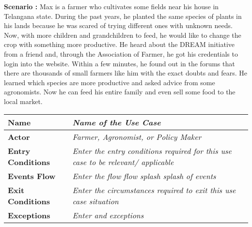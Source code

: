 \begin{flushleft}
\textbf{Scenario :} 
Max is a farmer who cultivates some fields near his house in Telangana state. During the past years, he planted the same species of plants in his lands because he was scared of trying different ones with unknown needs. Now, with more children and grandchildren to feed, he would like to change the crop with something more productive. 
He heard about the DREAM initiative from a friend and, through the Association of Farmer, he got his credentials to login into the website.
Within a few minutes, he found out in the forums that there are thousands of small farmers like him with the exact doubts and fears.
He learned which species are more productive and asked advice from some agronomists.
Now he can feed his entire family and even sell some food to the local market.
\end{flushleft}

\begin{center}
\begin{tabular}{|l|>{\raggedright\arraybackslash}m{12cm}|}

    \hline
    \textbf{Name} & \textit{Name of the Use Case}\\
    \hline
   	\textbf{Actor} & \textit{Farmer, Agronomist, or Policy Maker}\\
    \hline
    \textbf{Entry Conditions} & \textit{Enter the entry conditions required for this use case to be relevant/ applicable}\\
    \hline
    \textbf{Events Flow} & \textit{Enter the flow flow splash splash of events}\\
    \hline
    \textbf{Exit Conditions} & \textit{Enter the circumstances required to exit this use case situation}\\
    \hline
    \textbf{Exceptions} & \textit{Enter and exceptions}\\
    \hline
\end{tabular}
\end{center}